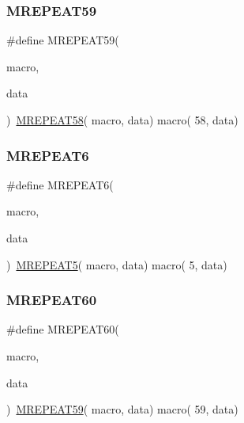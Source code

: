 \mbox{\label{group__group__sam0__utils__mrepeat_ga0cdad412352b83b391e04d59bc7302b5}} 
\subsubsection{\texorpdfstring{MREPEAT59}{MREPEAT59}}
{\footnotesize\ttfamily \#define M\+R\+E\+P\+E\+A\+T59(\begin{DoxyParamCaption}\item[{}]{macro,  }\item[{}]{data }\end{DoxyParamCaption})~\mbox{\hyperlink{group__group__sam0__utils__mrepeat_ga36b3ee8ed153de1e332867165d8bd129}{M\+R\+E\+P\+E\+A\+T58}}( macro, data)   macro( 58, data)}

\mbox{\label{group__group__sam0__utils__mrepeat_ga1c868616b8ea237923942783244f4512}} 
\subsubsection{\texorpdfstring{MREPEAT6}{MREPEAT6}}
{\footnotesize\ttfamily \#define M\+R\+E\+P\+E\+A\+T6(\begin{DoxyParamCaption}\item[{}]{macro,  }\item[{}]{data }\end{DoxyParamCaption})~\mbox{\hyperlink{group__group__sam0__utils__mrepeat_gac581872cbc56cc1e30528c851a7cea40}{M\+R\+E\+P\+E\+A\+T5}}(  macro, data)   macro(  5, data)}

\mbox{\label{group__group__sam0__utils__mrepeat_ga4fd4e49134a22edba74f048333b8a4e6}} 
\subsubsection{\texorpdfstring{MREPEAT60}{MREPEAT60}}
{\footnotesize\ttfamily \#define M\+R\+E\+P\+E\+A\+T60(\begin{DoxyParamCaption}\item[{}]{macro,  }\item[{}]{data }\end{DoxyParamCaption})~\mbox{\hyperlink{group__group__sam0__utils__mrepeat_ga0cdad412352b83b391e04d59bc7302b5}{M\+R\+E\+P\+E\+A\+T59}}( macro, data)   macro( 59, data)}

